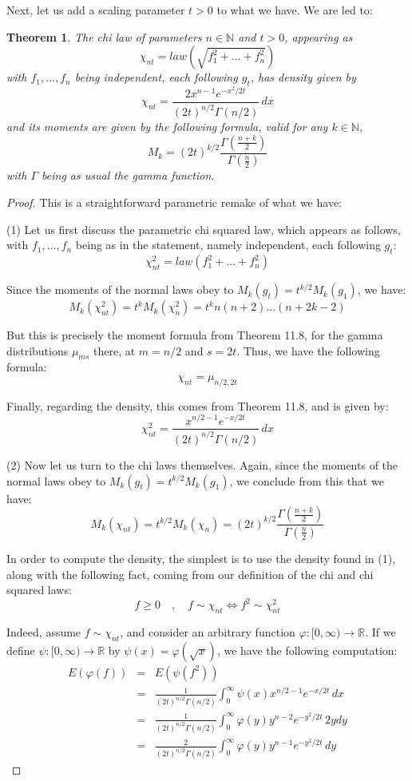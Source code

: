 \documentclass[12pt]{amsbook}
\newtheorem{theorem}{Theorem}[chapter]
\begin{document}
Next, let us add a scaling parameter $t>0$ to what we have. We are led to:

\begin{theorem}
The chi law of parameters $n\in\mathbb N$ and $t>0$, appearing as
$$\chi_{nt}=law\left(\sqrt{f_1^2+\ldots+f_n^2}\right)$$
with $f_1,\ldots,f_n$ being independent, each following $g_t$, has density given by
$$\chi_{nt}=\frac{2x^{n-1}e^{-x^2/2t}}{(2t)^{n/2}\Gamma(n/2)}\,dx$$
and its moments are given by the following formula, valid for any $k\in\mathbb N$,
$$M_k=(2t)^{k/2}\frac{\Gamma\left(\frac{n+k}{2}\right)}{\Gamma\left(\frac{n}{2}\right)}$$
with $\Gamma$ being as usual the gamma function.
\end{theorem}

\begin{proof}
This is a straightforward parametric remake of what we have:

\medskip

(1) Let us first discuss the parametric chi squared law, which appears as follows, with $f_1,\ldots,f_n$ being as in the statement, namely independent, each following $g_t$:
$$\chi_{nt}^2=law\left(f_1^2+\ldots+f_n^2\right)$$

Since the moments of the normal laws obey to $M_k(g_t)=t^{k/2}M_k(g_1)$, we have:
$$M_k(\chi_{nt}^2)=t^kM_k(\chi_n^2)=t^kn(n+2)\ldots(n+2k-2)$$

But this is precisely the moment formula from Theorem 11.8, for the gamma distributions $\mu_{ms}$ there, at $m=n/2$ and $s=2t$. Thus, we have the following formula:
$$\chi_{nt}=\mu_{n/2,2t}$$

Finally, regarding the density, this comes from Theorem 11.8, and is given by:
$$\chi_{nt}^2
=\frac{x^{n/2-1}e^{-x/2t}}{(2t)^{n/2}\Gamma(n/2)}\,dx$$

(2) Now let us turn to the chi laws themselves. Again, since the moments of the normal laws obey to $M_k(g_t)=t^{k/2}M_k(g_1)$, we conclude from this that we have:
$$M_k(\chi_{nt})=t^{k/2}M_k(\chi_n)=(2t)^{k/2}\frac{\Gamma\left(\frac{n+k}{2}\right)}{\Gamma\left(\frac{n}{2}\right)}$$

In order to compute the density, the simplest is to use the density found in (1), along with the following fact, coming from our definition of the chi and chi squared laws:
$$f\geq0\quad,\quad f\sim\chi_{nt}\iff f^2\sim\chi_{nt}^2$$

Indeed, assume $f\sim\chi_{nt}$, and consider an arbitrary function $\varphi:[0,\infty)\to\mathbb R$. If we define $\psi:[0,\infty)\to\mathbb R$ by $\psi(x)=\varphi(\sqrt{x})$, we have the following computation:
\begin{eqnarray*}
E(\varphi(f))
&=&E(\psi(f^2))\\
&=&\frac{1}{(2t)^{n/2}\Gamma(n/2)}\int_0^\infty\psi(x)x^{n/2-1}e^{-x/2t}\,dx\\
&=&\frac{1}{(2t)^{n/2}\Gamma(n/2)}\int_0^\infty\varphi(y)y^{n-2}e^{-y^2/2t}\,2ydy\\
&=&\frac{2}{(2t)^{n/2}\Gamma(n/2)}\int_0^\infty\varphi(y)y^{n-1}e^{-y^2/2t}\,dy
\end{eqnarray*}


\end{proof}
\end{document}
